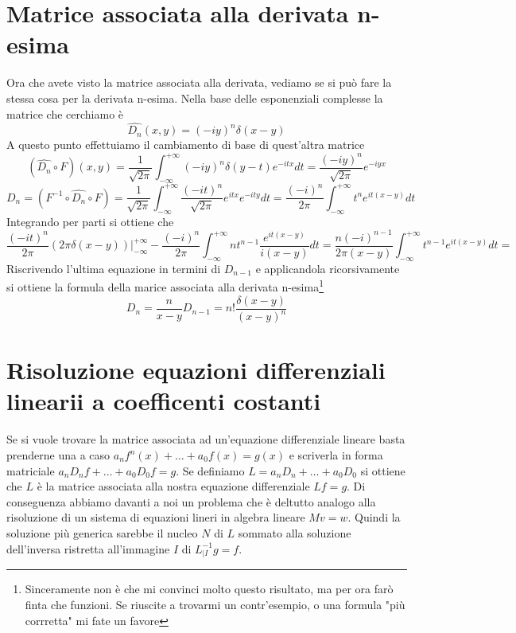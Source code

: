 \documentclass[11pt,a4paper]{report}
\theoremstyle{definition}
\theoremstyle{plain}
\theoremstyle{plain}
\begin{document}
		\section{Matrice associata alla derivata n-esima}
			Ora che avete visto la matrice associata alla derivata, vediamo se si può fare la stessa cosa per la derivata n-esima.
			Nella base delle esponenziali complesse la matrice che cerchiamo è 
			\begin{equation}
				\widehat{D_n}(x,y)=(-iy)^n\delta(x-y)
			\end{equation}
			A questo punto effettuiamo il cambiamento di base di quest'altra matrice
			\[
				(\widehat{D_n}\circ F)(x,y)=
				\frac{1}{\sqrt{2\pi}}\int_{-\infty}^{+\infty}(-iy)^n\delta(y-t)e^{-itx}dt=
				\frac{(-iy)^n}{\sqrt{2\pi}}e^{-iyx}
			\]
			\[
				D_n=(F^{-1}\circ \widehat{D_n}\circ F)=
				\frac{1}{\sqrt{2\pi}}\int_{-\infty}^{+\infty}\frac{(-it)^n}{\sqrt{2\pi}}e^{itx}e^{-ity}dt=
				\frac{(-i)^n}{2\pi}\int_{-\infty}^{+\infty}t^n e^{it(x-y)}dt
			\]
			Integrando per parti si ottiene che
			\[
				\frac{(-it)^n}{2\pi}(2\pi\delta(x-y))\bigg\rvert_{-\infty}^{+\infty}-
				\frac{(-i)^n}{2\pi}\int_{-\infty}^{+\infty}nt^{n-1}\frac{e^{it(x-y)}}{i(x-y)}dt=
				\frac{n(-i)^{n-1}}{2\pi(x-y)}\int_{-\infty}^{+\infty}t^{n-1}e^{it(x-y)}dt=	
			\]
			Riscrivendo l'ultima equazione in termini di $D_{n-1}$ e applicandola ricorsivamente si ottiene la formula della marice associata alla derivata n-esima\footnote{Sinceramente non è che mi convinci molto questo risultato, ma per ora farò finta che funzioni. Se riuscite a trovarmi un contr'esempio, o una formula "più corrretta" mi fate un favore}
			\begin{equation}
				D_{n}=\frac{n}{x-y}D_{n-1}=n!\frac{\delta(x-y)}{(x-y)^n}
			\end{equation}	



		\section{Risoluzione equazioni differenziali linearii a coefficenti costanti}
			Se si vuole trovare la matrice associata ad un'equazione differenziale lineare basta prenderne una a caso $a_nf^{n}(x)+\dots +a_0f(x)=g(x)$ e scriverla in forma matriciale $a_nD_nf+\dots+a_0D_0f=g$.\newline
			Se definiamo $L=a_nD_n+\dots+a_0D_0$ si ottiene che $L$ è la matrice associata alla nostra equazione differenziale $Lf=g$.\newline
			Di conseguenza abbiamo davanti a noi un problema che è deltutto analogo alla risoluzione di un sistema di equazioni lineri in algebra lineare $Mv=w$.\newline
			Quindi la soluzione più generica sarebbe il nucleo $N$ di $L$ sommato alla soluzione dell'inversa ristretta all'immagine $I$ di $L^{-1}_{|I}g=f$.\newline
\end{document}
